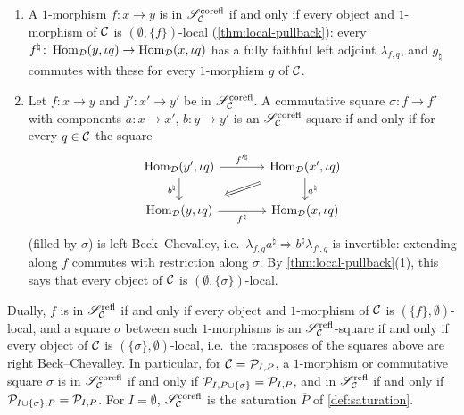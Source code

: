 \begin{lem}
\label{lem:saturation-explicit}
%
\leavevmode
\begin{enumerate}
\item A $1$-morphism $f\colon x \to y$ is in
$\mathscr{S}^{\mathrm{corefl}}_{\mathcal{C}}$
if and only if every object and $1$-morphism of $\mathcal{C}$ is
$(\emptyset,\{f\})$-local (\cref{thm:local-pullback}): every
$f^{\natural}\colon \operatorname{Hom}_{\mathcal{D}}(y,\iota q) \to \operatorname{Hom}_{\mathcal{D}}(x,\iota q)$
has a fully faithful left adjoint $\lambda_{f,q}$,
and $g_{\natural}$ commutes with these for every $1$-morphism $g$ of $\mathcal{C}$.
\item Let $f\colon x \to y$ and $f'\colon x' \to y'$ be in
$\mathscr{S}^{\mathrm{corefl}}_{\mathcal{C}}$.
A commutative square
$\sigma\colon f \to f'$
with components $a\colon x \to x'$, $b\colon y \to y'$ is an
$\mathscr{S}^{\mathrm{corefl}}_{\mathcal{C}}$-square
if and only if for every $q \in \mathcal{C}$ the square
\begin{equation*}
\begin{tikzcd}[column sep=large]
\Hom_{\D}(y',\iota q) \ar[r, "f'^{\natural}"] \ar[d,
"b^{\natural}"'] & \Hom_{\D}(x',\iota q) \ar[d, "a^{\natural}"] \ar[dl,
Rightarrow, shorten=4mm] \\
\Hom_{\D}(y,\iota q) \ar[r, "f^{\natural}"'] & \Hom_{\D}(x,\iota q)
\end{tikzcd}
\end{equation*}
(filled by $\sigma$) is left Beck--Chevalley, i.e.\
$\lambda_{f,q}a^{\natural} \Rightarrow b^{\natural}\lambda_{f',q}$
is invertible: extending along $f$ commutes with restriction along $\sigma$.
By \cref{thm:local-pullback}(1), this says that every object of $\mathcal{C}$ is
$(\emptyset,\{\sigma\})$-local.
\end{enumerate}
Dually, $f$ is in
$\mathscr{S}^{\mathrm{refl}}_{\mathcal{C}}$
if and only if every object and $1$-morphism of $\mathcal{C}$ is
$(\{f\},\emptyset)$-local, and a square $\sigma$ between such $1$-morphisms is
an
$\mathscr{S}^{\mathrm{refl}}_{\mathcal{C}}$-square
if and only if every object of $\mathcal{C}$ is
$(\{\sigma\},\emptyset)$-local,
i.e.\ the transposes of the squares above are right Beck--Chevalley.
In particular, for $\mathcal{C} = \mathcal{P}_{I,P}$, a $1$-morphism or commutative square
$\sigma$ is in
$\mathscr{S}^{\mathrm{corefl}}_{\mathcal{C}}$
if and only if
$\mathcal{P}_{I,P \cup \{\sigma\}} = \mathcal{P}_{I,P}$,
and in
$\mathscr{S}^{\mathrm{refl}}_{\mathcal{C}}$
if and only if
$\mathcal{P}_{I \cup \{\sigma\},P} = \mathcal{P}_{I,P}$.
For $I = \emptyset$,
$\mathscr{S}^{\mathrm{corefl}}_{\mathcal{C}}$
is the saturation $\overline{P}$ of \cref{def:saturation}.
\end{lem}

